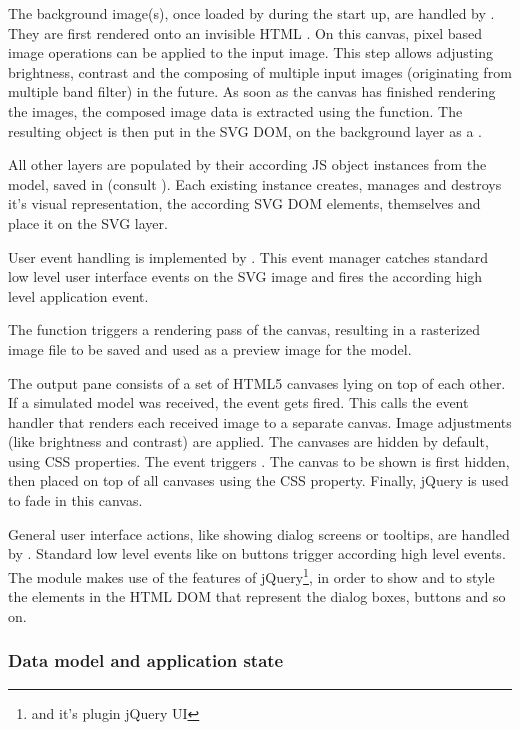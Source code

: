The background image(s), once loaded by  during the start up, are handled by .
They are first rendered onto an invisible HTML .
On this canvas, pixel based image operations can be applied to the input image.
This step allows adjusting brightness, contrast and the composing of multiple input images (originating from multiple band filter) in the future.
As soon as the canvas has finished rendering the images, the composed image data is extracted using the  function.
The resulting object is then put in the SVG DOM, on the background layer as a .

All other layers are populated by their according JS object instances from the model, saved in  (consult ).
Each existing instance creates, manages and destroys it's visual representation, the according SVG DOM elements, themselves and place it on the SVG layer.

User event handling is implemented by .
This event manager catches standard low level user interface events on the SVG image and fires the according high level application event.

The function  triggers a rendering pass of the canvas, resulting in a rasterized image file to be saved and used as a preview image for the model.


The output pane  consists of a set of HTML5 canvases lying on top of each other.
If a simulated model was received, the event  gets fired.
This calls the event handler  that renders each received image to a separate canvas.
Image adjustments (like brightness and contrast) are applied.
The canvases are hidden by default, using CSS properties.
The event  triggers .
The canvas to be shown is first hidden, then placed on top of all canvases using the CSS  property.
Finally, jQuery is used to fade in this canvas.


General user interface actions, like showing dialog screens or tooltips, are handled by .
Standard low level events like  on buttons trigger according high level events.
The module  makes use of the features of jQuery\footnote{and it's plugin jQuery UI}, in order to show and to style the elements in the HTML DOM that represent the dialog boxes, buttons and so on.



\subsubsection{Data model and application state}
\label{sec:state}

